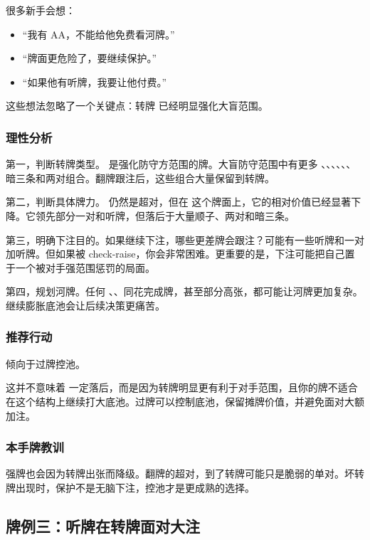 很多新手会想：

\begin{itemize}
\item “我有 AA，不能给他免费看河牌。”
\item “牌面更危险了，要继续保护。”
\item “如果他有听牌，我要让他付费。”
\end{itemize}

这些想法忽略了一个关键点：转牌  已经明显强化大盲范围。

\subsubsection*{理性分析}

第一，判断转牌类型。 是强化防守方范围的牌。大盲防守范围中有更多 、、、、、、暗三条和两对组合。翻牌跟注后，这些组合大量保留到转牌。

第二，判断具体牌力。 仍然是超对，但在  这个牌面上，它的相对价值已经显著下降。它领先部分一对和听牌，但落后于大量顺子、两对和暗三条。

第三，明确下注目的。如果继续下注，哪些更差牌会跟注？可能有一些听牌和一对加听牌。但如果被 check-raise，你会非常困难。更重要的是，下注可能把自己置于一个被对手强范围惩罚的局面。

第四，规划河牌。任何 、、同花完成牌，甚至部分高张，都可能让河牌更加复杂。继续膨胀底池会让后续决策更痛苦。

\subsubsection*{推荐行动}

倾向于过牌控池。

这并不意味着  一定落后，而是因为转牌明显更有利于对手范围，且你的牌不适合在这个结构上继续打大底池。过牌可以控制底池，保留摊牌价值，并避免面对大额加注。

\subsubsection*{本手牌教训}

强牌也会因为转牌出张而降级。翻牌的超对，到了转牌可能只是脆弱的单对。坏转牌出现时，保护不是无脑下注，控池才是更成熟的选择。

\subsection{牌例三：听牌在转牌面对大注}

